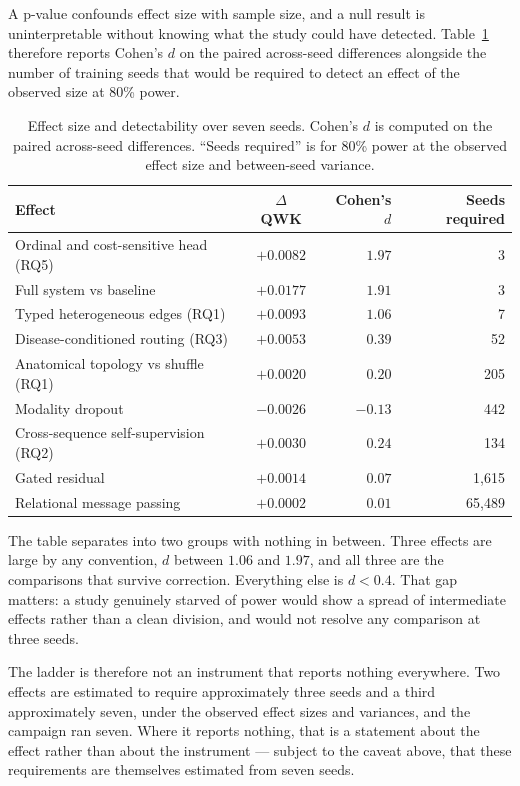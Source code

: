 \documentclass[12pt,a4paper]{report}
\begin{document}
A p-value confounds effect size with sample size, and a null result is
uninterpretable without knowing what the study could have detected.
Table~\ref{tab:power} therefore reports Cohen's $d$ on the paired across-seed
differences alongside the number of training seeds that would be required to
detect an effect of the observed size at 80\% power.

\begin{table}[htbp]
\centering
\caption{Effect size and detectability over seven seeds. Cohen's $d$ is
computed on the paired across-seed differences. \enquote{Seeds required} is
for 80\% power at the observed effect size and between-seed variance.}
\label{tab:power}
\begin{tabular}{lcrr}
\toprule
Effect & $\Delta$ QWK & Cohen's $d$ & Seeds required \\
\midrule
Ordinal and cost-sensitive head (RQ5) & $+0.0082$ & $\mathbf{1.97}$ & 3 \\
Full system vs baseline & $+0.0177$ & $\mathbf{1.91}$ & 3 \\
Typed heterogeneous edges (RQ1) & $+0.0093$ & $\mathbf{1.06}$ & 7 \\
\midrule
Disease-conditioned routing (RQ3) & $+0.0053$ & $0.39$ & 52 \\
Anatomical topology vs shuffle (RQ1) & $+0.0020$ & $0.20$ & 205 \\
Modality dropout & $-0.0026$ & $-0.13$ & 442 \\
Cross-sequence self-supervision (RQ2) & $+0.0030$ & $0.24$ & 134 \\
Gated residual & $+0.0014$ & $0.07$ & 1{,}615 \\
Relational message passing & $+0.0002$ & $0.01$ & 65{,}489 \\
\bottomrule
\end{tabular}
\end{table}

The table separates into two groups with nothing in between. Three effects are
large by any convention, $d$ between $1.06$ and $1.97$, and all three are the
comparisons that survive correction. Everything else is $d < 0.4$. That gap
matters: a study genuinely starved of power would show a spread of intermediate
effects rather than a clean division, and would not resolve any comparison at
three seeds.

The ladder is therefore not an instrument that reports nothing everywhere. Two
effects are estimated to require approximately three seeds and a third
approximately seven, under the observed effect sizes and variances, and the
campaign ran seven. Where it reports nothing, that is a statement about the
effect rather than about the instrument --- subject to the caveat above, that
these requirements are themselves estimated from seven seeds.
\end{document}

